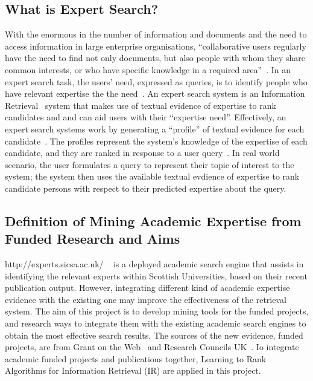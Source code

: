 \subsection{What is Expert Search?}
With the enormous in the number of information and documents and the need to access information in large enterprise organisations,
``collaborative users regularly have the need to find not only documents, but also people with whom they share common interests, 
or who have specific knowledge in a required area''~\cite[P. 388]{expertsearch}. In an expert search task,
the users' need, expressed as queries, is to identify people who have relevant expertise the the need~\cite[P. 387]{expertsearch}.
An expert search system is an Information Retrieval~\cite{IR} system that makes use of textual evidence 
of expertise to rank candidates and and can aid users with their ``expertise need''. Effectively, an expert search systems work by generating a ``profile'' 
of textual evidence for each candidate~\cite[P. 388]{expertsearch}. The profiles represent the system's knowledge of the expertise of each 
candidate, and they are ranked in response to a user query~\cite[P. 388]{expertsearch}. In real world scenario, the user formulates a query to 
represent their topic of interest to the system; the system then uses the available textual evdience of expertise to rank candidate persons with 
respect to their predicted expertise about the query.

\subsection{Definition of Mining Academic Expertise from Funded Research and Aims}\label{section:aims}
http://experts.sicsa.ac.uk/ ~\cite{sicsasearch} is a deployed academic search engine that assists in identifying the relevant experts within Scottish Universities, 
based on their recent publication output. However, integrating different kind of academic expertise evidence with the existing one may improve
the effectiveness of the retrieval system. The aim of this project is to develop mining tools for the funded projects, 
and research ways to integrate them with the existing academic search engines to obtain the most effective search results. 
The sources of the new evidence, funded projects, are from Grant on the Web~\cite{gow} and Research Councils UK~\cite{gtr}.
Io integrate academic funded projects and publications together, Learning to Rank Algorithms for Information Retrieval (IR) are applied in this project.

